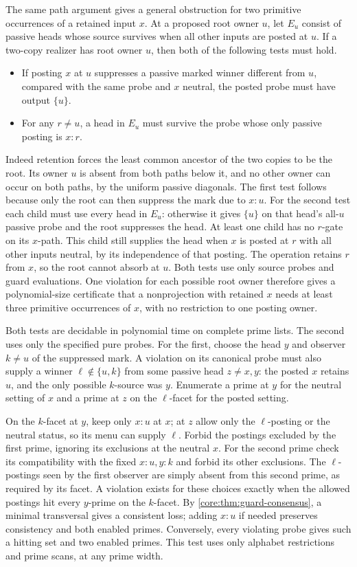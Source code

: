The same path argument gives a general obstruction
for two primitive occurrences of a retained input
$x$. At a proposed root owner $u$, let $E_u$ consist
of passive heads whose source survives when all
other inputs are posted at $u$. If a two-copy
realizer has root owner $u$, then both of the
following tests must hold.
\begin{itemize}
\item If posting $x$ at $u$ suppresses a passive
marked winner different from $u$, compared with
the same probe and $x$ neutral, the posted probe
must have output $\{u\}$.
\item For any $r\ne u$, a head in $E_u$ must
survive the probe whose only passive posting
is $x:r$.
\end{itemize}
Indeed retention forces the least common ancestor
of the two copies to be the root. Its owner $u$
is absent from both paths below it, and no other
owner can occur on both paths, by the uniform
passive diagonals. The first test follows because
only the root can then suppress the mark due to
$x:u$. For the second test each child must use
every head in $E_u$: otherwise it gives $\{u\}$
on that head's all-$u$ passive probe and the root
suppresses the head. At least one child has no
$r$-gate on its $x$-path. This child still supplies
the head when $x$ is posted at $r$ with all other
inputs neutral, by its independence of that
posting. The operation retains $r$ from $x$, so
the root cannot absorb at $u$. Both tests use only
source probes and guard evaluations. One violation
for each possible root owner therefore gives a
polynomial-size certificate that a nonprojection
with retained $x$ needs at least three primitive
occurrences of $x$, with no restriction to one
posting owner.

Both tests are decidable in polynomial time on
complete prime lists. The second uses only the
specified pure probes. For the first, choose the
head $y$ and observer $k\ne u$ of the suppressed
mark. A violation on its canonical probe must
also supply a winner $\ell\notin\{u,k\}$ from
some passive head $z\ne x,y$: the posted $x$
retains $u$, and the only possible $k$-source
was $y$. Enumerate a prime at $y$ for the neutral
setting of $x$ and a prime at $z$ on the
$\ell$-facet for the posted setting.

On the $k$-facet at $y$, keep only $x:u$ at $x$;
at $z$ allow only the $\ell$-posting or the neutral
status, so its menu can supply $\ell$. Forbid the
postings excluded by the first prime, ignoring
its exclusions at the neutral $x$. For the
second prime check its compatibility with the
fixed $x:u,y:k$ and forbid its other exclusions.
The $\ell$-postings seen by the first observer
are simply absent from this second prime, as
required by its facet. A violation exists for
these choices exactly when the allowed postings
hit every $y$-prime on the $k$-facet. By
\cref{core:thm:guard-consensus}, a minimal
transversal gives a consistent loss; adding
$x:u$ if needed preserves consistency and both
enabled primes. Conversely, every violating
probe gives such a hitting set and two enabled
primes. This test uses only alphabet restrictions
and prime scans, at any prime width.

